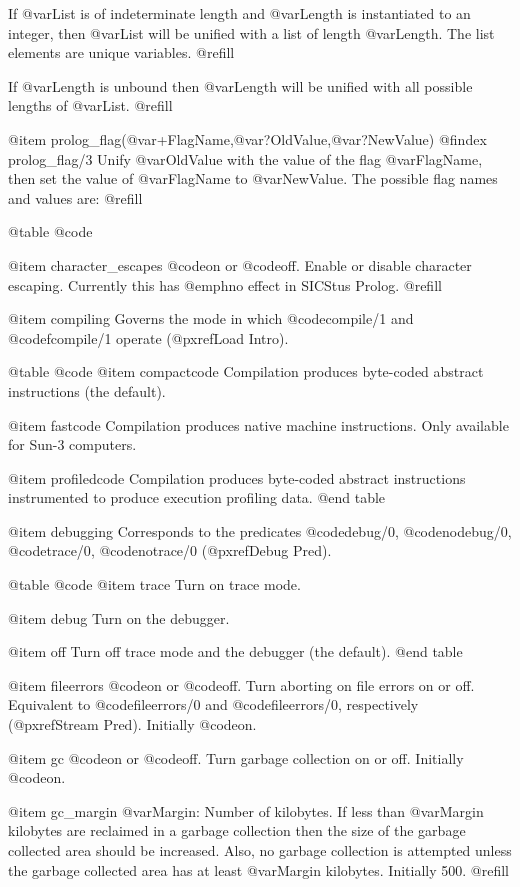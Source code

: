 If @var{List} is of indeterminate length and @var{Length} is instantiated
to an integer, then @var{List} will be unified with a list of length
@var{Length}.  The list elements are unique variables. @refill

If @var{Length} is unbound then @var{Length} will be unified with all
possible lengths of @var{List}. @refill

@item prolog_flag(@var{+FlagName},@var{?OldValue},@var{?NewValue})
@findex prolog_flag/3
Unify @var{OldValue} with the value of the flag @var{FlagName}, then set
the value of @var{FlagName} to @var{NewValue}.  The possible flag names
and values are: @refill

@table @code

@item character_escapes
@code{on} or @code{off}.  Enable or disable character escaping.
Currently this has @emph{no effect} in SICStus Prolog. @refill

@item compiling
Governs the mode in which @code{compile/1} and @code{fcompile/1}
operate (@pxref{Load Intro}).

@table @code
@item compactcode
Compilation produces byte-coded abstract instructions (the default).

@item fastcode
Compilation produces native machine instructions.  Only available for
Sun-3 computers.

@item profiledcode
Compilation produces byte-coded abstract instructions instrumented to
produce execution profiling data.  
@end table

@item debugging
Corresponds to the predicates @code{debug/0}, @code{nodebug/0},
@code{trace/0}, @code{notrace/0} (@pxref{Debug Pred}).

@table @code
@item trace
Turn on trace mode. 

@item debug
Turn on the debugger.

@item off
Turn off trace mode and the debugger (the default).
@end table

@item fileerrors
@code{on} or @code{off}.  Turn aborting on file errors on or off.
Equivalent to @code{fileerrors/0} and @code{fileerrors/0}, respectively
(@pxref{Stream Pred}).  Initially @code{on}.

@item gc
@code{on} or @code{off}.  Turn garbage collection on or off.
Initially @code{on}.

@item gc_margin
@var{Margin}: Number of kilobytes.  If less than @var{Margin} kilobytes
are reclaimed in a garbage collection then the size of the garbage
collected area should be increased.  Also, no garbage collection is
attempted unless the garbage collected area has at least @var{Margin}
kilobytes.  Initially 500. @refill


